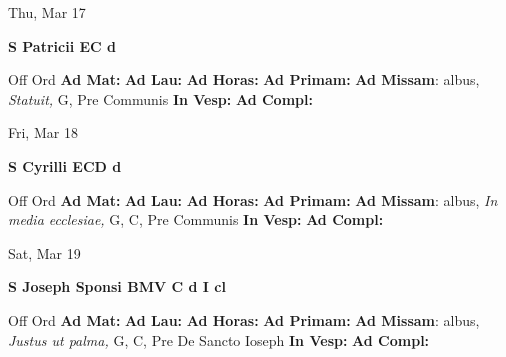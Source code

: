 \documentclass[10pt]{memoir}
\begin{document}
\begin{center}
\begin{minipage}{3.5in}
\vspace{2em}
\begin{center}Thu, Mar 17
\end{center}
\textbf{ \large S Patricii EC
\textnormal{\normalsize d}}

\begin{justify}Off Ord
\textbf{Ad Mat: }
\textbf{Ad Lau: }
\textbf{Ad Horas: }
\textbf{Ad Primam: }\textbf{Ad Missam}: albus, \textit{Statuit,} G, Pre Communis
\textbf{In Vesp: }
\textbf{Ad Compl: }
\end{justify}
\end{minipage}
\end{center}

\begin{center}
\begin{minipage}{3.5in}
\vspace{2em}
\begin{center}Fri, Mar 18
\end{center}
\textbf{ \large S Cyrilli ECD
\textnormal{\normalsize d}}

\begin{justify}Off Ord
\textbf{Ad Mat: }
\textbf{Ad Lau: }
\textbf{Ad Horas: }
\textbf{Ad Primam: }\textbf{Ad Missam}: albus, \textit{In media ecclesiae,} G, C, Pre Communis
\textbf{In Vesp: }
\textbf{Ad Compl: }
\end{justify}
\end{minipage}
\end{center}

\begin{center}
\begin{minipage}{3.5in}
\vspace{2em}
\begin{center}Sat, Mar 19
\end{center}
\textbf{ \large S Joseph Sponsi BMV C
\textnormal{\normalsize d I cl}}

\begin{justify}Off Ord
\textbf{Ad Mat: }
\textbf{Ad Lau: }
\textbf{Ad Horas: }
\textbf{Ad Primam: }\textbf{Ad Missam}: albus, \textit{Justus ut palma,} G, C, Pre De Sancto Ioseph
\textbf{In Vesp: }
\textbf{Ad Compl: }
\end{justify}
\end{minipage}
\end{center}
\end{document}
